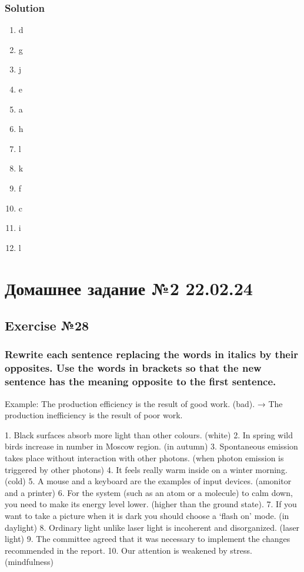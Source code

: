 \subsection*{Solution}
\begin{enumerate}
      \item d
      \item g
      \item j
      \item e
      \item a
      \item h
      \item l
      \item k
      \item f
      \item c
      \item i
      \item l
\end{enumerate}

\chapter{Домашнее задание №2 22.02.24}

\section*{Exercise №28}
\subsection*{Rewrite each sentence replacing the words in italics by their opposites.
      Use the words in brackets so that the new sentence has the meaning opposite to
      the first sentence.}
Example: The production efficiency is the result of good work. (bad). → The production
inefficiency is the result of poor work.

1. Black surfaces absorb more light than other colours. (white) 2. In spring wild birds
increase in number in Moscow region. (in autumn) 3. Spontaneous emission takes place
without interaction with other photons. (when photon emission is triggered by other
photons) 4. It feels really warm inside on a winter morning. (cold) 5. A mouse and a
keyboard are the examples of input devices. (amonitor and a printer) 6. For the system
(such as an atom or a molecule) to calm down, you need to make its energy level lower.
(higher than the ground state). 7. If you want to take a picture when it is dark you
should choose a ‘flash on’ mode. (in daylight) 8. Ordinary light unlike laser light is
incoherent and disorganized. (laser light) 9. The committee agreed that it was necessary
to implement the changes recommended in the report. 10. Our attention is weakened by
stress. (mindfulness)

